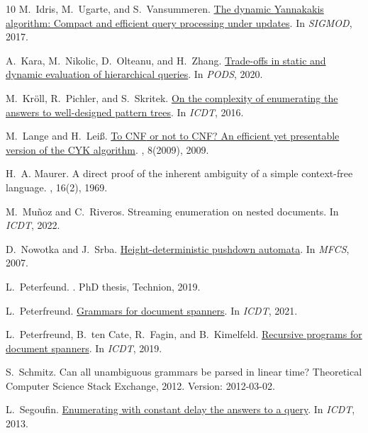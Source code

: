 \begin{thebibliography}{10}
M.~Idris, M.~Ugarte, and S.~Vansummeren.
\newblock \href{https://www.martinugarte.com/media/pdfs/main_pDxeVno.pdf}{The
  dynamic {Y}annakakis algorithm: Compact and efficient query processing under
  updates}.
\newblock In {\em SIGMOD}, 2017.

A.~Kara, M.~Nikolic, D.~Olteanu, and H.~Zhang.
\newblock \href{https://arxiv.org/abs/1907.01988}{Trade-offs in static and
  dynamic evaluation of hierarchical queries}.
\newblock In {\em PODS}, 2020.

M.~Kr{\"o}ll, R.~Pichler, and S.~Skritek.
\newblock
  \href{https://drops.dagstuhl.de/opus/volltexte/2016/5791/pdf/21.pdf}{On the
  complexity of enumerating the answers to well-designed pattern trees}.
\newblock In {\em ICDT}, 2016.

M.~Lange and H.~Lei{\ss}.
\newblock
  \href{https://www.informaticadidactica.de/uploads/Artikel/LangeLeiss2009/LangeLeiss2009.pdf}{To
  {CNF} or not to {CNF}? An efficient yet presentable version of the {CYK}
  algorithm}.
, 8(2009), 2009.

H.~A. Maurer.
\newblock A direct proof of the inherent ambiguity of a simple context-free
  language.
, 16(2), 1969.

M.~Mu{\~{n}}oz and C.~Riveros.
\newblock Streaming enumeration on nested documents.
\newblock In {\em ICDT}, 2022.

D.~Nowotka and J.~Srba.
\newblock
  \href{http://www2.informatik.uni-stuttgart.de/fmi/szs/people/nowotka/Papers/Hpda.pdf}{Height-deterministic
  pushdown automata}.
\newblock In {\em MFCS}, 2007.

L.~Peterfeund.
.
\newblock PhD thesis, Technion, 2019.

L.~Peterfreund.
\newblock
  \href{https://drops.dagstuhl.de/opus/volltexte/2021/13715/pdf/LIPIcs-ICDT-2021-7.pdf}{Grammars
  for document spanners}.
\newblock In {\em ICDT}, 2021.

L.~Peterfreund, B.~ten Cate, R.~Fagin, and B.~Kimelfeld.
\newblock
  \href{https://drops.dagstuhl.de/opus/volltexte/2019/10315/pdf/LIPIcs-ICDT-2019-13.pdf}{Recursive
  programs for document spanners}.
\newblock In {\em ICDT}, 2019.

S.~Schmitz.
\newblock Can all unambiguous grammars be parsed in linear time?
\newblock Theoretical Computer Science Stack Exchange, 2012.
\newblock Version: 2012-03-02.

L.~Segoufin.
\newblock \href{https://hal.inria.fr/hal-00907085}{Enumerating with constant
  delay the answers to a query}.
\newblock In {\em ICDT}, 2013.

\end{thebibliography}
